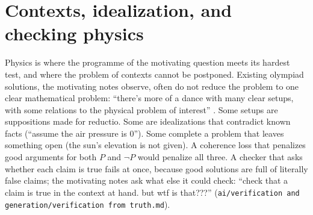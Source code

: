 \providecommand{\fM}{\mathfrak{M}}
\providecommand{\fF}{\mathcal{F}}
\providecommand{\fG}{\mathcal{G}}
\providecommand{\fK}{\mathcal{K}}
\providecommand{\tset}[1]{\lVert #1\rVert}
\providecommand{\cder}{\Vdash}
\providecommand{\dom}{\operatorname{dom}}
\providecommand{\osc}{\operatorname{osc}}
\providecommand{\AUX}{\mathsf{AUX}}
\providecommand{\Anc}{\mathrm{Anc}}
\providecommand{\Ccert}{C_{\mathrm{cert}}}
\providecommand{\Asm}{\mathrm{Asm}}
\providecommand{\Ax}{\mathrm{Ax}}
\providecommand{\ACCEPT}{\textsf{ACCEPT}}
\providecommand{\REJECT}{\textsf{REJECT}}
\providecommand{\rl}[1]{\textup{(#1)}}

\section{Contexts, idealization, and checking physics}\label{sec:physics}

Physics is where the programme of the motivating question meets its hardest test, and
where the problem of contexts cannot be postponed. Existing olympiad solutions, the
motivating notes observe, often do not reduce the problem to one clear mathematical
problem: ``there's more of a dance with many clear setups, with some relations to the
physical problem of interest'' \citep[\texttt{ai/verification and generation/verification
of physics olympiad solutions/the structure of physics olympiad solutions.md}]{hanni2026notes}.
Some setups are suppositions made for reductio. Some are idealizations that contradict
known facts (``assume the air pressure is $0$''). Some complete a problem that leaves
something open (the sun's elevation is not given). A coherence loss that penalizes good
arguments for both $P$ and $\neg P$ would penalize all three. A checker that asks whether
each claim is true fails at once, because good solutions are full of literally false
claims; the motivating notes ask what else it could check: ``check that a claim is true in
the context at hand. but wtf is that???'' (\texttt{ai/verification and
generation/verification from truth.md}).

